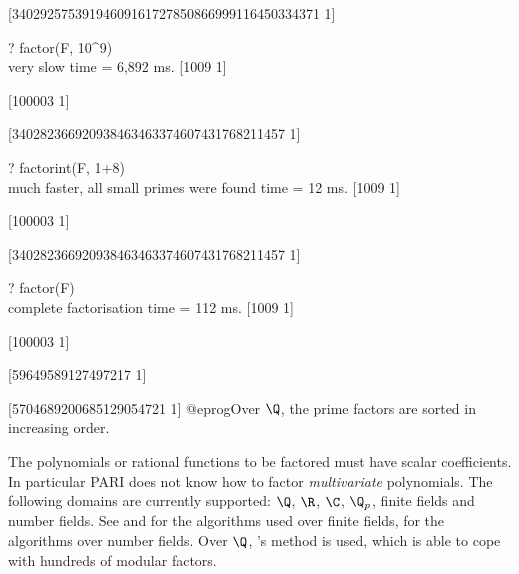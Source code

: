[34029257539194609161727850866999116450334371 1]

? factor(F, 10^9)    \\ very slow
time = 6,892 ms.
[1009 1]

[100003 1]

[340282366920938463463374607431768211457 1]

? factorint(F, 1+8)  \\ much faster, all small primes were found
time = 12 ms.
[1009 1]

[100003 1]

[340282366920938463463374607431768211457 1]

? factor(F)   \\ complete factorisation
time = 112 ms.
[1009 1]

[100003 1]

[59649589127497217 1]

[5704689200685129054721 1]
@eprog\noindent Over $\Q$, the prime factors are sorted in increasing order.

The polynomials or rational functions to be factored must have scalar
coefficients. In particular PARI does not know how to factor
\emph{multivariate} polynomials. The following domains are currently
supported: $\Q$, $\R$, $\C$, $\Q_p$, finite fields and number fields.
See  and  for
the algorithms used over finite fields,  for the algorithms
over number fields. Over $\Q$, 's method is used, which is
able to cope with hundreds of modular factors.

